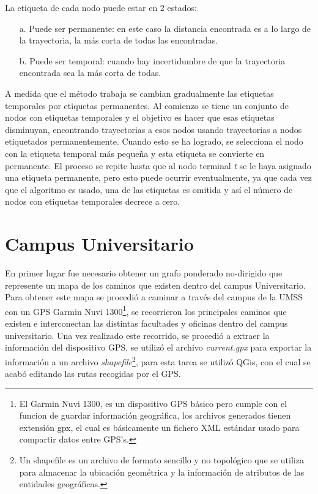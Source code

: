       La etiqueta de cada nodo puede estar en 2 estados:

      \begin{itemize}
        \item[a.] Puede ser permanente: en este caso la distancia encontrada es a lo largo de la trayectoria, la más corta de todas las encontradas.
        \item[b.] Puede ser temporal: cuando hay incertidumbre de que la trayectoria encontrada sea la más corta de todas.
      \end{itemize}

      A medida que el método trabaja se cambian gradualmente las etiquetas temporales por etiquetas permanentes. Al comienzo se tiene un conjunto de nodos con etiquetas temporales y el objetivo es hacer que esas etiquetas disminuyan, encontrando trayectorias a esos nodos usando trayectorias a nodos etiquetados permanentemente. Cuando esto se ha logrado, se selecciona el nodo con la etiqueta temporal más pequeña y esta etiqueta se convierte en permanente. El proceso se repite hasta que al nodo terminal \emph{t} se le haya asignado una etiqueta permanente, pero esto puede ocurrir eventualmente, ya que cada vez que el algoritmo es usado, una de las etiquetas es omitida y así el número de nodos con etiquetas temporales decrece a cero. \cite{teoria_grafos} \\



  \section{Campus Universitario}
  \label{sec:ruta_corta_umss}

  En primer lugar fue necesario obtener un grafo ponderado no-dirigido que represente un mapa de los caminos que existen dentro del campus Universitario.\\

  Para obtener este mapa se procedió a caminar a través del campus de la UMSS con un GPS Garmin Nuvi 1300\footnote{El Garmin Nuvi 1300, es un dispositivo GPS básico pero cumple con el funcion de guardar información geográfica, los archivos generados tienen extensión gpx, el cual es básicamente un fichero XML estándar usado para compartir datos entre GPS's.}, se recorrieron los principales caminos que existen e interconectan las distintas facultades y oficinas dentro del campus universitario. Una vez realizado este recorrido, se procedió a extraer la información del dispositivo GPS, se utilizó el archivo \emph{current.gpx} para exportar la información  a un archivo \emph{shapefile}\footnote{Un shapefile es un archivo de formato sencillo y no topológico que se utiliza para almacenar la ubicación geométrica y la información de atributos de las entidades geográficas.\cite{what_is_shapefile} }, para esta tarea se utilizó QGis, con el cual se acabó editando las rutas recogidas por el GPS.\\


